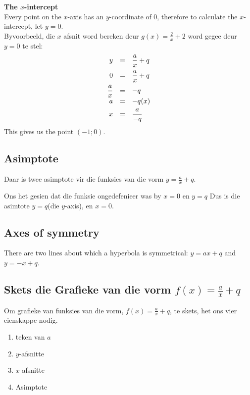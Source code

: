 \textbf{The $x$-intercept} \\
Every point on the $x$-axis has an $y$-coordinate of $0$, therefore to calculate the $x$-intercept, let $y=0$.\\
Byvoorbeeld, die  $x$ afsnit word bereken deur $g(x)=\frac{2}{x}+2$ word gegee deur $y=0$ te stel:
\begin{equation*}
\begin{array}{ccl}
\hfill y& =& \dfrac{a}{x}+q\hfill \vspace{4pt}\\
 \hfill 0& =& \dfrac{a}{x}+q\hfill \vspace{4pt} \\
 \hfill \dfrac{a}{x}& =& -q\hfill \\
 \hfill a& =& -q(x)\hfill \vspace{4pt}\\
 \hfill x& =& \dfrac{a}{-q}\hfill 
\end{array}
\end{equation*}
This gives us the point $(-1; 0)$.


\subsection*{Asimptote}

Daar is twee asimptote vir die funksies van die vorm $y=\frac{a}{x}+q$. \par 
Ons het gesien dat die funksie ongedefenieer was by $x=0$ en $y=q$ Dus is die asimtote $y=q$(die $y$-axis), en $x=0$. 

\subsection*{Axes of symmetry}
There are two lines about which a hyperbola is symmetrical: $y=ax+q$ and $y = -x +q$.


\subsection*{Skets die Grafieke van die vorm  $f(x)=\frac{a}{x}+q$}

Om grafieke van funksies van die vorm, $f(x)=\frac{a}{x}+q$, te skets, het ons vier eienskappe nodig.
\begin{enumerate}[noitemsep, label=\textbf{\arabic*}. ] 
\item teken van $a$
\item $y$-afsnitte
\item $x$-afsnitte
\item Asimptote
\end{enumerate}

